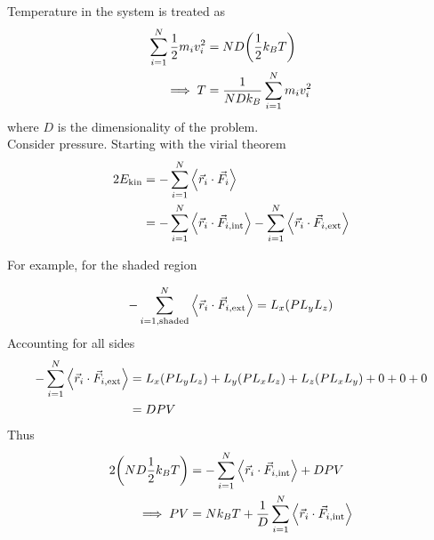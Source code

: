 \documentclass[12pt,a4paper,titlepage]{article}
\newcommand{\trm}[1]{\textrm{#1}} %
\begin{document}
Temperature in the system is treated as
\begin{equation}
\begin{aligned}
\sum_{i=1}^{N}\frac{1}{2}m_{i}v_{i}^{2}&=ND\qty(\frac{1}{2}k_{B}T)\\
\implies T&=\frac{1}{NDk_{B}}\sum_{i=1}^{N}m_{i}v_{i}^{2}
\end{aligned}
\end{equation}
where $D$ is the dimensionality of the problem.\\

Consider pressure. Starting with the virial theorem
\begin{equation}
\begin{aligned}
2E_{\trm{kin}}&=-\sum_{i=1}^{N}\ev{\vec{r}_{i}\cdot\vec{F}_{i}}\\
&=-\sum_{i=1}^{N}\ev{\vec{r}_{i}\cdot\vec{F}_{i,\trm{int}}}-\sum_{i=1}^{N}\ev{\vec{r}_{i}\cdot\vec{F}_{i,\trm{ext}}}
\end{aligned}
\end{equation}

For example, for the shaded region
\begin{center}
\end{center}
\begin{equation}
-\sum_{i=1,\trm{shaded}}^{N}\ev{\vec{r}_{i}\cdot\vec{F}_{i,\trm{ext}}}=L_{x}(PL_{y}L_{z})
\end{equation}
Accounting for all sides
\begin{equation}
\begin{aligned}
-\sum_{i=1}^{N}\ev{\vec{r}_{i}\cdot\vec{F}_{i,\trm{ext}}}&=L_{x}(PL_{y}L_{z})+L_{y}(PL_{x}L_{z})+L_{z}(PL_{x}L_{y})+0+0+0\\
&=DPV
\end{aligned}
\end{equation}
Thus
\begin{equation}
\begin{aligned}
2\qty(ND\frac{1}{2}k_{B}T)&=-\sum_{i=1}^{N}\ev{\vec{r}_{i}\cdot\vec{F}_{i,\trm{int}}}+DPV\\
\implies PV&=Nk_{B}T+\frac{1}{D}\sum_{i=1}^{N}\ev{\vec{r}_{i}\cdot\vec{F}_{i,\trm{int}}}
\end{aligned}
\end{equation}
\end{document}
